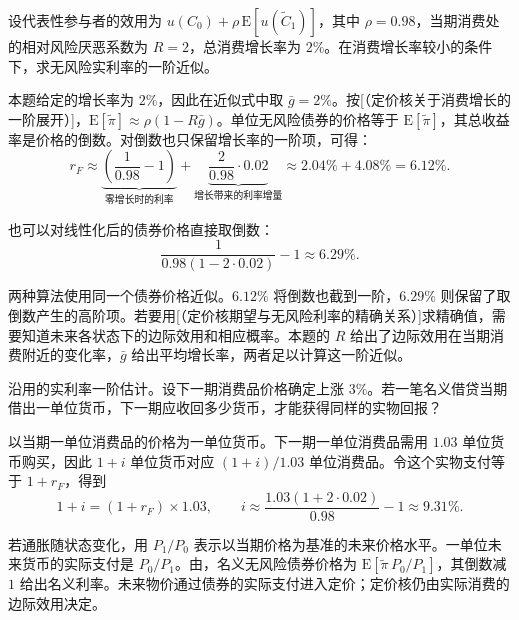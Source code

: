 \begin{tcolorbox}[example]
\begin{question}
 设代表性参与者的效用为 $u(C_0)+\rho\,\mathrm E[u(\widetilde C_1)]$，其中 $\rho=0.98$，当期消费处的相对风险厌恶系数为 $R=2$，总消费增长率为 $2\%$。在消费增长率较小的条件下，求无风险实利率的一阶近似。
\end{question}
\begin{solution}[blank-type=manual]
本题给定的增长率为 $2\%$，因此在近似式中取 $\bar g=2\%$。按[（定价核关于消费增长的一阶展开）]，$\mathrm E[\widetilde\pi]\approx\rho(1-R\bar g)$。单位无风险债券的价格等于 $\mathrm E[\widetilde\pi]$，其总收益率是价格的倒数。对倒数也只保留增长率的一阶项，可得：
\[
 r_F\approx
 \underbrace{\left(\frac1{0.98}-1\right)}_{\text{零增长时的利率}}
 +\underbrace{\frac{2}{0.98}\cdot0.02}_{\text{增长带来的利率增量}}
 \approx 2.04\%+4.08\%=6.12\%.
\]

也可以对线性化后的债券价格直接取倒数：
\[
 \frac{1}{0.98(1-2\cdot0.02)}-1\approx 6.29\%.
\]

两种算法使用同一个债券价格近似。$6.12\%$ 将倒数也截到一阶，$6.29\%$ 则保留了取倒数产生的高阶项。若要用[（定价核期望与无风险利率的精确关系）]求精确值，需要知道未来各状态下的边际效用和相应概率。本题的 $R$ 给出了边际效用在当期消费附近的变化率，$\bar g$ 给出平均增长率，两者足以计算这一阶近似。
\end{solution}
\end{tcolorbox}

\begin{tcolorbox}[example,title=补充算例：从实利率换算名义利率]
\begin{question}
沿用的实利率一阶估计。设下一期消费品价格确定上涨 $3\%$。若一笔名义借贷当期借出一单位货币，下一期应收回多少货币，才能获得同样的实物回报？
\end{question}
\begin{solution}[blank-type=manual]
以当期一单位消费品的价格为一单位货币。下一期一单位消费品需用 $1.03$ 单位货币购买，因此 $1+i$ 单位货币对应 $(1+i)/1.03$ 单位消费品。令这个实物支付等于 $1+r_F$，得到
\[
 1+i=(1+r_F)\times1.03,
 \qquad
 i\approx\frac{1.03(1+2\cdot0.02)}{0.98}-1\approx9.31\%.
\]

若通胀随状态变化，用 $P_1/P_0$ 表示以当期价格为基准的未来价格水平。一单位未来货币的实际支付是 $P_0/P_1$。由，名义无风险债券价格为 $\mathrm E[\widetilde\pi\,P_0/P_1]$，其倒数减 $1$ 给出名义利率。未来物价通过债券的实际支付进入定价；定价核仍由实际消费的边际效用决定。
\end{solution}
\end{tcolorbox}

